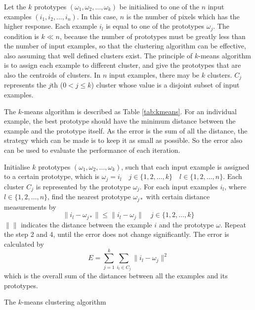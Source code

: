 Let the $k$ prototypes $(\omega_1,\omega_2,\ldots,\omega_k)$ be initialised to one of the $n$ input examples $(i_1,i_2,\ldots,i_n)$. In this case, $n$ is the number of pixels which has the higher response. Each example $i_l$ is equal to one of the prototypes $\omega_j$. The condition is $k\ll n$, because the number of prototypes must be greatly less than the number of input examples, so that the clustering algorithm can be effective, also assuming that well defined clusters exist. The principle of $k$-means algorithm is to assign each example to different cluster, and give the prototypes that are also the centroids of clusters.  In $n$ input examples, there may be $k$ clusters. $C_j$ represents the $j$th ($0<j\le k$) cluster whose value is a disjoint subset of input examples.

The $k$-means algorithm is described as \mbox{Table} \ref{tab:kmeans}. For an individual example, the best prototype should have the minimum distance between the example and the prototype itself. As the error is the sum of all the distance, the strategy which can be made is to keep it as small as possible. So the error also can be used to evaluate the performance of each iteration. 
\begin{table}[ht]
 \begin{algorithmic}[1]
  \STATE Initialise $k$ prototypes $(\omega_1,\omega_2,\ldots,\omega_k)$, such that each input example is assigned to a certain prototype, which is $\omega_j=i_l\quad j\in\{1,2,\ldots,k\}\quad l\in\{1,2,\ldots,n\}$.
  \STATE Each cluster $C_j$ is represented by the prototype $\omega_j$.
  \STATE For each input examples $i_l$, where $l\in \{1,2,\ldots,n\}$, find the nearest prototype $\omega_{j*}$ with certain distance measurements by
\begin{equation}
 \|i_l-\omega_{j*}\| \le \|i_l-\omega_j\| \quad j\in\{1,2,\ldots,k\}
\end{equation}
  $\|\|$ indicates the distance between the example $i$ and the prototype $\omega$.
   \STATE Repeat the step 2 and 4, until the error does not change significantly. The error is calculated by
\begin{equation}
 E = \sum_{j=1}^k \sum_{i_l\in C_j}\| i_l-\omega_j\|^2
\end{equation}
which is the overall sum of the distances between all the examples and its prototypes.
 \end{algorithmic}
\caption{The $k$-means clustering algorithm}
\label{tab:kmeans}
\end{table} 

